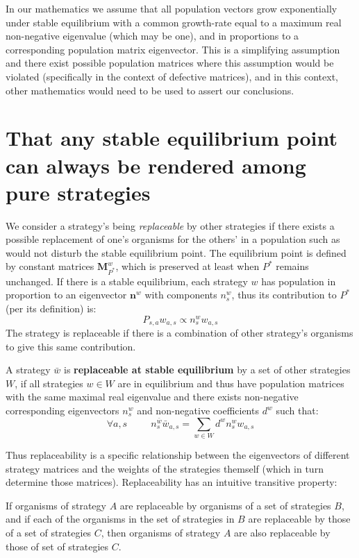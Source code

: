 In our mathematics we assume that all population vectors grow exponentially under stable equilibrium with a common growth-rate equal to a maximum real non-negative eigenvalue (which may be one), and in proportions to a corresponding population matrix eigenvector.
This is a simplifying assumption and there exist possible population matrices where this assumption would be violated (specifically in the context of defective matrices), and in this context, other mathematics would need to be used to assert our conclusions.

\section{That any stable equilibrium point can always be rendered among pure strategies}\label{appendix5}
We consider a strategy's being \textit{replaceable} by other strategies if there exists a possible replacement of one's organisms for the others' in a population such as would not disturb the stable equilibrium point. The equilibrium point is defined by constant matrices $\mathbf{M}_{P^*}^w$, which is preserved at least when $P^*$ remains unchanged.
If there is a stable equilibrium, each strategy $w$ has population in proportion to an eigenvector $\mathbf{n}^w$ with components $n^w_s$, thus its contribution to $P^*$ (per its definition) is:
$$P_{s,a}w_{a,s} \propto n^w_sw_{a,s}$$
The strategy is replaceable if there is a combination of other strategy's organisms to give this same contribution.

\begin{definition}\label{def1}
A strategy $\bar{w}$ is \textbf{replaceable at stable equilibrium} by a set of other strategies $W$, if all strategies $w\in W$ are in equilibrium and thus have population matrices with the same maximal real eigenvalue and there exists non-negative corresponding eigenvectors $n^w_s$ and non-negative coefficients $d^w$ such that:
$$\forall a,s~~~~~~~~~~~ n^{\bar{w}}_s\bar{w}_{a,s} = \sum_{w\in W}d^wn^w_sw_{a,s} $$
\end{definition}

Thus replaceability is a specific relationship between the eigenvectors of different strategy matrices and the weights of the strategies themself (which in turn determine those matrices).
Replaceability has an intuitive transitive property:

\begin{definition}\label{def3}
If organisms of strategy $A$ are replaceable by organisms of a set of strategies $B$, and if each of the organisms in the set of strategies in $B$ are replaceable by those of a set of strategies $C$, then organisms of strategy $A$ are also replaceable by those of set of strategies $C$.
\end{definition}

